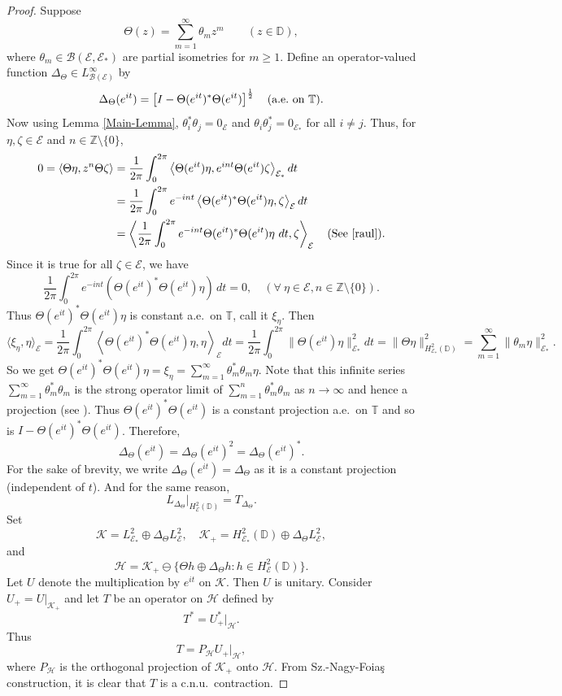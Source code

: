 \documentclass[12pt]{amsart}
\newcommand{\clb}{\mathcal{B}}
\newcommand{\cle}{\mathcal{E}}
\newcommand{\clh}{\mathcal{H}}
\newcommand{\clk}{\mathcal{K}}
\newcommand{\D}{\mathbb{D}}
\newcommand{\Z}{\mathbb{Z}}
\newcommand{\T}{\mathbb{T}}
\newcommand{\E}{\mathcal{E}}
\newcommand{\he}{{H}^2_\mathcal{E}(\mathbb{D})}
\theoremstyle{definition}
\theoremstyle{plain}
\theoremstyle{definition}
\numberwithin{equation}{section}
\begin{document}
\begin{proof}
Suppose
\[
\Theta( z)=\sum_{m=1}^\infty \theta_mz^m    \quad\quad (z \in \D),
\]
where $\theta_m \in \mathcal{B}(\E,\E_*)$ are partial isometries for $m \geq 1$. 
Define an operator-valued function $\Delta_{\Theta} \in L^\infty_{\clb(\cle)}$ by 
\[
\Delta_{\Theta}(e^{it})=\left[I -\Theta(e^{it})^*\Theta(e^{it})\right]^{1 \over 2} \quad (\text{a.e.\ on } \T).
\]
Now using  Lemma \ref{Main-Lemma}, $\theta_i^* \theta_j=0_{\cle}$ and $\theta_i \theta_j^*=0_{\cle_*}$ for all $i \neq j$. Thus, for $\eta, \zeta \in \cle$ and $n\in \Z\setminus\{0\}$,
\begin{align*}
0=\langle \Theta\eta, z^n \Theta \zeta\rangle&=\frac{1}{2\pi}\int_{0}^{2\pi} \left\langle \Theta(e^{it})\eta,e^{int}\Theta(e^{it})\zeta\right\rangle_{\cle_*} dt\\
& = \frac{1}{2\pi}\int_{0}^{2\pi} e^{-int} \left\langle \Theta(e^{it})^*\Theta(e^{it})\eta,\zeta\right\rangle_{\cle} dt\\
&=\left\langle  \frac{1}{2\pi}\int_{0}^{2\pi} e^{-int} \Theta(e^{it})^*\Theta(e^{it})\eta  \ dt,\zeta\right\rangle_{\cle} \quad \text{(See \cite[Appendix\ A]{raul})}.
\end{align*}
Since it is true for all $\zeta \in \cle$, we have
\[
\frac{1}{2\pi}\int_{0}^{2\pi} e^{-int} \left(\Theta(e^{it})^*\Theta(e^{it})\eta\right)\, dt=0, \quad  (\forall\ \eta \in \cle, n \in \Z\setminus \{0\}).
\]
Thus $\Theta(e^{it})^*\Theta(e^{it})\eta$ is constant a.e.\ on $\T$, call it $\xi_{\eta}$. Then
\[
\langle \xi_\eta, \eta\rangle_{\cle}=\frac{1}{2\pi}\int_{0}^{2\pi}\left\langle \Theta(e^{it})^*\Theta(e^{it})\eta, \eta\right\rangle_{\cle} dt =\frac{1}{2\pi}\int_{0}^{2\pi} \|\Theta(e^{it})\eta\|_{\cle_*}^2 dt = \|\Theta \eta\|_{H^2_{\cle_*}(\D)}^2=\sum\limits_{m=1}^\infty \|\theta_m \eta\|_{\cle_*}^2.
\]
So we get $\Theta(e^{it})^*\Theta(e^{it})\eta=\xi_\eta=\sum\limits_{m=1}^\infty \theta_m^*\theta_m \eta.$ Note that this infinite series $\sum\limits_{m=1}^\infty \theta_m^*\theta_m$ is the strong operator limit of $\sum\limits_{m=1}^n \theta_m^*\theta_m$  as $ n \rightarrow \infty$ and hence a projection (see \cite[Chapter II, Problem 3.5]{conway}). Thus $\Theta(e^{it})^*\Theta(e^{it})$ is a constant projection a.e.\ on $\T$ and  so is $I -\Theta(e^{it})^*\Theta(e^{it})$. 
Therefore, 
\[
\Delta_{\Theta}(e^{it})=\Delta_{\Theta}(e^{it})^2 = \Delta_{\Theta}(e^{it})^{*}.
\]
For the sake of brevity, we write $\Delta_{\Theta}(e^{it})=\Delta_{\Theta}$ as it is a constant projection (independent of $t$). And for the same reason, 
\[
L_{\Delta_\Theta}|_{H^2_\cle(\D)}=T_{\Delta_\Theta}.
\] 
Set
\[
\clk=L^2_{\E_*} \oplus \Delta_{\Theta} L^2_\E, \quad\clk_+=H^2_{\E_*}(\D) \oplus \Delta_{\Theta} L^2_\E,
\]
and 
\[
\mathcal H=\clk_+\ominus \{\Theta h \oplus\Delta_{\Theta} h: h \in \he\}.
\]
Let $U$ denote the multiplication by $e^{it}$ on $\clk$. Then $U$ is unitary. 
Consider $U_+=U|_{\clk_+}$ and let $T$ be an operator on $\mathcal H$ defined by
\[
T^*=U_+^*|_\mathcal{H}.
\]
Thus
\[
T=P_\mathcal{H}U_+|_\mathcal{H},
\]
where $P_\mathcal H$ is the orthogonal projection of $\clk_+$ onto $\clh$. From 
Sz.-Nagy-Foia\c{s} construction, it is clear that $T$ is a c.n.u.\ contraction.  




\end{proof}
\end{document}
